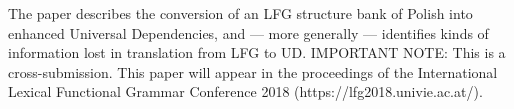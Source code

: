 The paper describes the conversion of an LFG structure bank of Polish into enhanced Universal Dependencies, and --- more generally --- identifies kinds of information lost in translation from LFG to UD. IMPORTANT NOTE: This is a cross-submission. This paper will appear in the proceedings of the International Lexical Functional Grammar Conference 2018 (https://lfg2018.univie.ac.at/).
